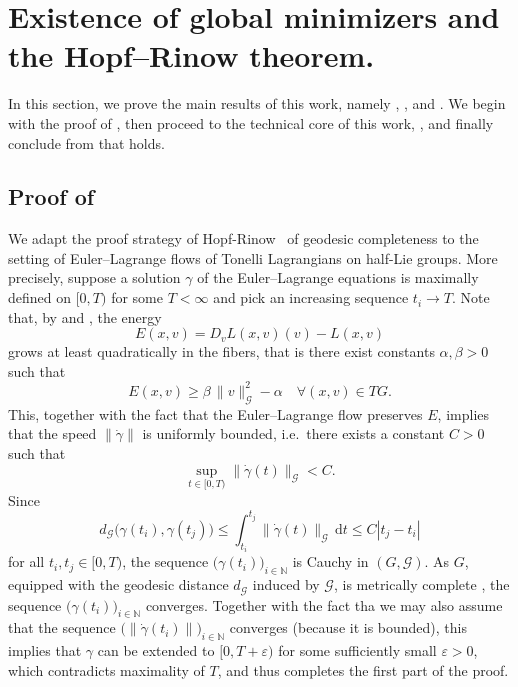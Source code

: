 \documentclass[11pt,reqno]{amsart}
\theoremstyle{plain}
\theoremstyle{definition}
\theoremstyle{plain} %
\theoremstyle{definition} %
\numberwithin{equation}{section}
\def\NN{{\mathbb N}}
\begin{document}
\section{Existence of global minimizers and the Hopf--Rinow theorem.} \label{s: The Hopf–Rinow theorem for Tonelli Lagrangians.}
In this section, we prove the main results of this work, namely , , and . 
We begin with the proof of , then proceed to the technical core of this work, , and finally conclude from  that  holds. 
\subsection{Proof of }We adapt the proof strategy of Hopf-Rinow~\cite{HR} of geodesic completeness to the setting of Euler--Lagrange flows of Tonelli Lagrangians on half-Lie groups. More precisely, suppose a solution \( \gamma \) of the Euler--Lagrange equations is maximally defined on \( [0, T) \) for some \( T < \infty \) and pick an increasing sequence \( t_i \to T \). Note that, by  and , the energy
\[
    E(x, v) = D_v L(x, v)(v) - L(x, v)
\]
grows at least quadratically in the fibers, that is there exist constants \( \alpha, \beta > 0 \) such that 
\[
    E(x, v) \geq \beta \, \| v \|_{\mathcal{G}}^2 - \alpha \quad \forall (x, v) \in TG.
\]
This, together with the fact that the Euler–Lagrange flow preserves \( E \), implies that the speed \( \| \dot{\gamma} \| \) is uniformly bounded, i.e.\ there exists a constant \( C > 0 \) such that 
\begin{equation}\label{eq: velocity uniformly bounded}
    \sup_{t \in [0,T)} \| \dot{\gamma}(t) \|_{\mathcal{G}} < C.
\end{equation}
Since
\[
    d_{\mathcal{G}} \big( \gamma(t_i), \gamma(t_j) \big) 
    \leq \int_{t_i}^{t_j} \| \dot{\gamma}(t) \|_{\mathcal{G}} \, \mathrm{d}t 
    \leq C |t_j - t_i|
\]
for all \( t_i, t_j \in [0,T) \), the sequence \( \big( \gamma(t_i) \big)_{i \in \NN} \) is Cauchy in \( (G, \mathcal{G}) \).  
As \( G \), equipped with the geodesic distance \( d_{\mathcal{G}} \) induced by \( \mathcal{G} \), is metrically complete \cite[Theorem~7.7]{Bauer_2025}, the sequence \( \big( \gamma(t_i) \big)_{i \in \mathbb{N}} \) converges. 
Together with the fact tha we may also assume that the sequence \( \big( \| \dot{\gamma}(t_i) \| \big)_{i \in \mathbb{N}} \) converges (because it is bounded), this implies that \( \gamma \) can be extended to \( [0, T + \varepsilon) \) for some sufficiently small \( \varepsilon > 0 \), which contradicts maximality of \( T \), and thus completes the first part of the proof.
\end{document}

